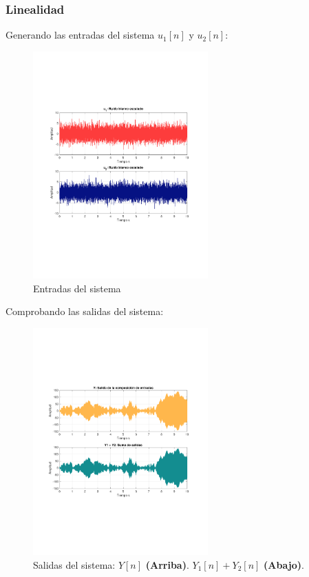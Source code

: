 		\subsubsection{Linealidad}
			Generando las entradas del sistema $u_{1}[n]$ y $u_{2}[n]$:
			\begin{figure}[H]
				\center
				\includegraphics[width=0.6\textwidth,clip, trim = {2cm 7.0cm 2.2cm 7.0cm}]{../imgs/sistema_3_linealidad_entradas.pdf}
				\caption{Entradas del sistema}
				\label{fig:s_3_lineality_inputs}
			\end{figure}
			Comprobando las salidas del sistema:
			\begin{figure}[H]
				\center
				\includegraphics[width=0.6\textwidth,clip, trim = {2cm 7.0cm 2.2cm 7.0cm}]{../imgs/sistema_3_linealidad_salidas.pdf}
				\caption{Salidas del sistema: $Y[n]$ \textbf{(Arriba)}. $Y_{1}[n] + Y_{2}[n]$ \textbf{(Abajo)}.}
				\label{fig:s_3_lineality_outputs}	
			\end{figure}

